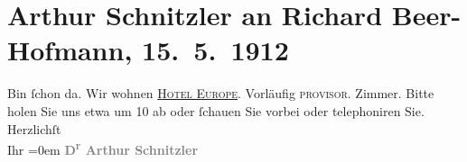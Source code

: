 

               \section[Arthur Schnitzler an Richard Beer-Hofmann, 15. 5. 1912]{ Arthur Schnitzler an Richard Beer-Hofmann, 15. 5. 1912}\nopagebreak{}\rehead{ }\begin{ledgroupsized}[t]{13cm}\normalsize\beginnumbering{} \toendnotes[C]{\smallbreak\pagebreak[2]} 
\pstart
           \noindent{}{\pb}Bin ſchon da. Wir wohnen \uline{\textsc{Hotel Europe}}. Vorläufig \textsc{provisor.} Zimmer. Bitte holen Sie uns etwa
               um 10 ab oder ſchauen Sie vorbei oder telepho{\pb}niren Sie.\pend
           \pstart
           Herzlichſt{\\[\baselineskip]}Ihr\pend
           \leftskip=0em{}\pstart
           \centering{}\textcolor{gray}{\textbf{D\textsuperscript{r} Arthur Schnitzler}}\pend
           \endnumbering{}\end{ledgroupsized}  \newcommand{\dateiname}{L02066}\newcommand{\titel}{Arthur Schnitzler an Richard Beer-Hofmann, 15. 5. 1912}\newcommand{\editorInnen}{Martin Anton Müller und Gerd-Hermann Susen}
      